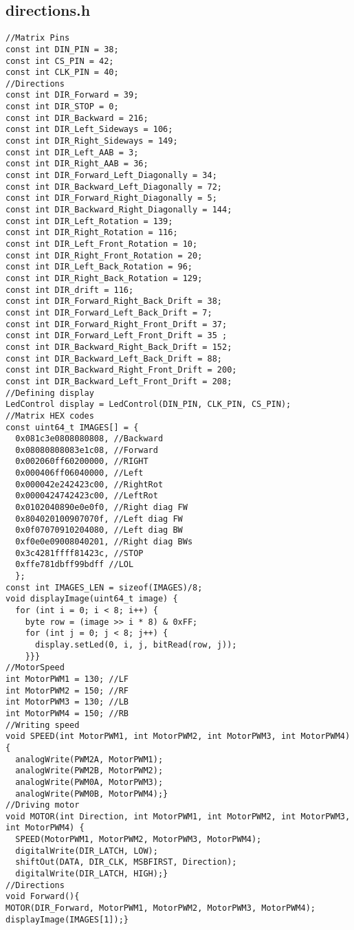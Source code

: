 \subsection{directions.h}
\begin{lstlisting}
//Matrix Pins
const int DIN_PIN = 38;
const int CS_PIN = 42;
const int CLK_PIN = 40;
//Directions
const int DIR_Forward = 39; 
const int DIR_STOP = 0;
const int DIR_Backward = 216;
const int DIR_Left_Sideways = 106;
const int DIR_Right_Sideways = 149;
const int DIR_Left_AAB = 3;
const int DIR_Right_AAB = 36;
const int DIR_Forward_Left_Diagonally = 34;
const int DIR_Backward_Left_Diagonally = 72;
const int DIR_Forward_Right_Diagonally = 5;
const int DIR_Backward_Right_Diagonally = 144;
const int DIR_Left_Rotation = 139;
const int DIR_Right_Rotation = 116;
const int DIR_Left_Front_Rotation = 10;
const int DIR_Right_Front_Rotation = 20;
const int DIR_Left_Back_Rotation = 96;
const int DIR_Right_Back_Rotation = 129;
const int DIR_drift = 116;
const int DIR_Forward_Right_Back_Drift = 38;
const int DIR_Forward_Left_Back_Drift = 7;
const int DIR_Forward_Right_Front_Drift = 37;
const int DIR_Forward_Left_Front_Drift = 35 ;
const int DIR_Backward_Right_Back_Drift = 152;
const int DIR_Backward_Left_Back_Drift = 88;
const int DIR_Backward_Right_Front_Drift = 200;
const int DIR_Backward_Left_Front_Drift = 208;
//Defining display
LedControl display = LedControl(DIN_PIN, CLK_PIN, CS_PIN);
//Matrix HEX codes
const uint64_t IMAGES[] = {
  0x081c3e0808080808, //Backward
  0x08080808083e1c08, //Forward
  0x002060ff60200000, //RIGHT
  0x000406ff06040000, //Left
  0x000042e242423c00, //RightRot
  0x0000424742423c00, //LeftRot
  0x0102040890e0e0f0, //Right diag FW
  0x804020100907070f, //Left diag FW
  0x0f07070910204080, //Left diag BW
  0xf0e0e09008040201, //Right diag BWs
  0x3c4281ffff81423c, //STOP
  0xffe781dbff99bdff //LOL
  };
const int IMAGES_LEN = sizeof(IMAGES)/8;
void displayImage(uint64_t image) {
  for (int i = 0; i < 8; i++) {
    byte row = (image >> i * 8) & 0xFF;
    for (int j = 0; j < 8; j++) {
      display.setLed(0, i, j, bitRead(row, j));
    }}}
//MotorSpeed
int MotorPWM1 = 130; //LF
int MotorPWM2 = 150; //RF
int MotorPWM3 = 130; //LB
int MotorPWM4 = 150; //RB
//Writing speed
void SPEED(int MotorPWM1, int MotorPWM2, int MotorPWM3, int MotorPWM4){
  analogWrite(PWM2A, MotorPWM1);
  analogWrite(PWM2B, MotorPWM2);
  analogWrite(PWM0A, MotorPWM3);
  analogWrite(PWM0B, MotorPWM4);}
//Driving motor
void MOTOR(int Direction, int MotorPWM1, int MotorPWM2, int MotorPWM3, int MotorPWM4) {
  SPEED(MotorPWM1, MotorPWM2, MotorPWM3, MotorPWM4);
  digitalWrite(DIR_LATCH, LOW);
  shiftOut(DATA, DIR_CLK, MSBFIRST, Direction);
  digitalWrite(DIR_LATCH, HIGH);}
//Directions
void Forward(){
MOTOR(DIR_Forward, MotorPWM1, MotorPWM2, MotorPWM3, MotorPWM4);
displayImage(IMAGES[1]);}


\end{lstlisting}
